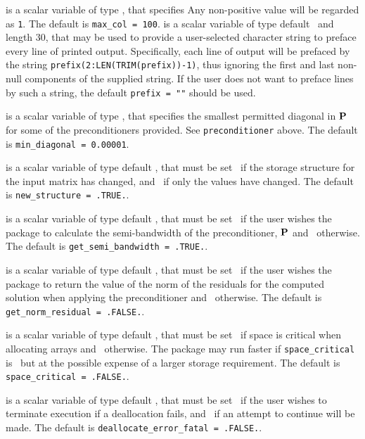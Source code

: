 \documentclass{galahad}
\begin{document}
\begin{description}
 is a scalar variable of type \integer, that specifies
Any non-positive value will be regarded as {\tt 1}.
The default is {\tt max\_col = 100}.
 is a scalar variable of type default \character\
and length 30, that may be used to provide a user-selected
character string to preface every line of printed output.
Specifically, each line of output will be prefaced by the string
{\tt prefix(2:LEN(TRIM(prefix))-1)},
thus ignoring the first and last non-null components of the
supplied string. If the user does not want to preface lines by such
a string, the default {\tt prefix = ""} should be used.

 is a scalar variable of type \realdp,
that specifies the smallest permitted diagonal in ${\mathbf{P}}$ for some
of the preconditioners provided. See {\tt preconditioner} above.
The default is {\tt min\_diagonal = 0.00001}.

 is a scalar variable of type default \logical,
that must be set \true\ if the storage structure for the input matrix has
changed, and \false\ if only the values have changed.
The default is {\tt new\_structure = .TRUE.}.

 is a scalar variable of type default \logical,
that must be set \true\ if the user wishes the package to calculate
the semi-bandwidth of the preconditioner, ${\mathbf{P}}$
and  \false\ otherwise.
The default is {\tt get\_semi\_bandwidth = .TRUE.}.

 is a scalar variable of type default \logical,
that must be set \true\ if the user wishes the package to return
the value of the norm of the residuals for the computed solution
when applying the preconditioner and  \false\ otherwise.
The default is {\tt get\_norm\_residual = .FALSE.}.

 is a scalar variable of type default \logical,
that must be set \true\ if space is critical when allocating arrays
and  \false\ otherwise. The package may run faster if
{\tt space\_critical} is \false\ but at the possible expense of a larger
storage requirement. The default is {\tt space\_critical = .FALSE.}.

 is a scalar variable of type default \logical,
that must be set \true\ if the user wishes to terminate execution if
a deallocation  fails, and \false\ if an attempt to continue
will be made. The default is {\tt deallocate\_error\_fatal = .FALSE.}.


\end{description}
\end{document}

